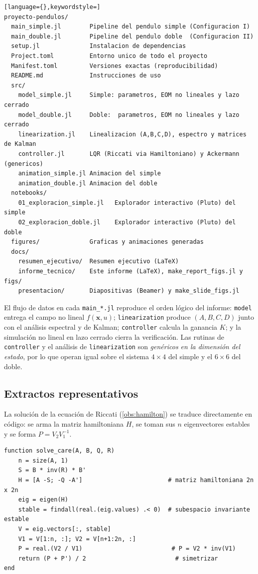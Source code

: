 \documentclass[11pt,letterpaper]{article}
\theoremstyle{definition}
\theoremstyle{plain}
\theoremstyle{remark}
\newcommand{\xv}{\bm{x}}
\begin{document}
\begin{lstlisting}[language={},keywordstyle=]
proyecto-pendulos/
  main_simple.jl        Pipeline del pendulo simple (Configuracion I)
  main_double.jl        Pipeline del pendulo doble  (Configuracion II)
  setup.jl              Instalacion de dependencias
  Project.toml          Entorno unico de todo el proyecto
  Manifest.toml         Versiones exactas (reproducibilidad)
  README.md             Instrucciones de uso
  src/
    model_simple.jl     Simple: parametros, EOM no lineales y lazo cerrado
    model_double.jl     Doble:  parametros, EOM no lineales y lazo cerrado
    linearization.jl    Linealizacion (A,B,C,D), espectro y matrices de Kalman
    controller.jl       LQR (Riccati via Hamiltoniano) y Ackermann (genericos)
    animation_simple.jl Animacion del simple
    animation_double.jl Animacion del doble
  notebooks/
    01_exploracion_simple.jl   Explorador interactivo (Pluto) del simple
    02_exploracion_doble.jl    Explorador interactivo (Pluto) del doble
  figures/              Graficas y animaciones generadas
  docs/
    resumen_ejecutivo/  Resumen ejecutivo (LaTeX)
    informe_tecnico/    Este informe (LaTeX), make_report_figs.jl y figs/
    presentacion/       Diapositivas (Beamer) y make_slide_figs.jl
\end{lstlisting}

El flujo de datos en cada \texttt{main\_*.jl} reproduce el orden lógico del
informe: \texttt{model} entrega el campo no lineal $f(\xv,u)$;
\texttt{linearization} produce $(A,B,C,D)$ junto con el análisis espectral y de
Kalman; \texttt{controller} calcula la ganancia $K$; y la simulación no lineal
en lazo cerrado cierra la verificación. Las rutinas de \texttt{controller} y el
análisis de \texttt{linearization} son \emph{genéricos en la dimensión del
estado}, por lo que operan igual sobre el sistema $4\times4$ del simple y el
$6\times6$ del doble.

\subsection*{Extractos representativos}

La solución de la ecuación de Riccati (\cref{obs:hamilton}) se traduce
directamente en código: se arma la matriz hamiltoniana $H$, se toman sus $n$
eigenvectores estables y se forma $P=V_2V_1^{-1}$.

\begin{lstlisting}
function solve_care(A, B, Q, R)
    n = size(A, 1)
    S = B * inv(R) * B'
    H = [A -S; -Q -A']                        # matriz hamiltoniana 2n x 2n
    eig = eigen(H)
    stable = findall(real.(eig.values) .< 0)  # subespacio invariante estable
    V = eig.vectors[:, stable]
    V1 = V[1:n, :]; V2 = V[n+1:2n, :]
    P = real.(V2 / V1)                         # P = V2 * inv(V1)
    return (P + P') / 2                         # simetrizar
end
\end{lstlisting}
\end{document}
